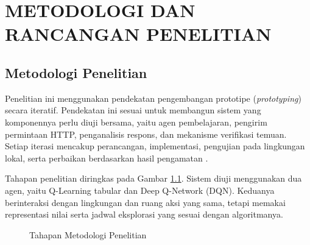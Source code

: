 \chapter{METODOLOGI DAN RANCANGAN PENELITIAN}

\section{Metodologi Penelitian}

Penelitian ini menggunakan pendekatan pengembangan prototipe (\textit{prototyping}) secara iteratif. Pendekatan ini sesuai untuk membangun sistem yang komponennya perlu diuji bersama, yaitu agen pembelajaran, pengirim permintaan HTTP, penganalisis respons, dan mekanisme verifikasi temuan. Setiap iterasi mencakup perancangan, implementasi, pengujian pada lingkungan lokal, serta perbaikan berdasarkan hasil pengamatan \cite{pressman2014}.

Tahapan penelitian diringkas pada Gambar \ref{fig:alur_metodologi_penelitian}. Sistem diuji menggunakan dua agen, yaitu Q-Learning tabular dan Deep Q-Network (DQN). Keduanya berinteraksi dengan lingkungan dan ruang aksi yang sama, tetapi memakai representasi nilai serta jadwal eksplorasi yang sesuai dengan algoritmanya.

\begin{figure}[H]
\centering
{}
\caption{Tahapan Metodologi Penelitian}
\label{fig:alur_metodologi_penelitian}
\end{figure}

